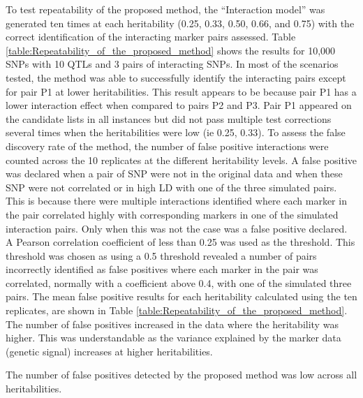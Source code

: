 \documentclass[preprint,12pt,3p]{elsarticle}
\begin{document}
To test repeatability of the proposed method, the ``Interaction model'' was generated ten times at each heritability
(0.25, 0.33, 0.50, 0.66, and 0.75) with the correct identification of the interacting marker pairs assessed. Table
\ref{table:Repeatability_of_the_proposed_method} shows the results for 10,000 SNPs with 10 QTLs and 3 pairs of
interacting SNPs. In most of the scenarios tested, the method was able to successfully identify the interacting pairs
except for pair P1 at lower heritabilities. This result appears to be because pair P1 has a lower interaction effect
when compared to pairs P2 and P3. Pair P1 appeared on the candidate lists in all instances but did not pass multiple
test corrections several times when the heritabilities were low (ie 0.25, 0.33).  To assess the false discovery rate of
the method, the number of false positive interactions were counted across the 10 replicates at the different
heritability levels. A false positive was declared when a pair of SNP were not in the original data and when these SNP
were not correlated or in high LD with one of the three simulated pairs. This is because there were multiple
interactions identified where each marker in the pair correlated highly with corresponding markers in one of the
simulated interaction pairs.  Only when this was not the case was a false positive declared. A Pearson correlation
coefficient of less than 0.25 was used as the threshold. This threshold was chosen as using a 0.5 threshold revealed a
number of pairs incorrectly identified as false positives where each marker in the pair was correlated, normally with a
coefficient above 0.4, with one of the simulated three pairs. The mean false positive results for each heritability
calculated using the ten replicates, are shown in Table \ref{table:Repeatability_of_the_proposed_method}. The number of
false positives increased in the data where the heritability was higher. This was understandable as the variance
explained by the marker data (genetic signal) increases at higher heritabilities.

The number of false positives detected by the proposed method was low across all heritabilities.
\end{document}
